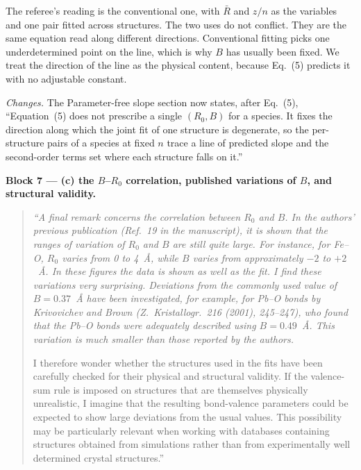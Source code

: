 \documentclass[11pt]{article}
\newenvironment{refquote}%
  {\begin{quote}\itshape\color{black!70}}%
  {\end{quote}}
\begin{document}
The referee's reading is the conventional one, with $\bar R$ and
$z/n$ as the variables and one pair fitted across structures.  The
two uses do not conflict.  They are the same equation read along
different directions.  Conventional fitting picks one underdetermined
point on the line, which is why $B$ has usually been fixed.  We treat
the direction of the line as the physical content, because Eq.~(5)
predicts it with no adjustable constant.

\emph{Changes.}  The Parameter-free slope section now states, after
Eq.~(5), ``Equation~(5) does not prescribe a single $(R_0,B)$ for a
species.  It fixes the direction along which the joint fit of one
structure is degenerate, so the per-structure pairs of a species at
fixed $n$ trace a line of predicted slope and the second-order terms
set where each structure falls on it.''

\textbf{Block 7 --- (c) the $B$--$R_0$ correlation, published
variations of $B$, and structural validity.}

\begin{refquote}
``A final remark concerns the correlation between $R_0$ and $B$.  In
the authors' previous publication (Ref.~19 in the manuscript), it is
shown that the ranges of variation of $R_0$ and $B$ are still quite
large.  For instance, for Fe--O, $R_0$ varies from 0 to 4~\AA, while
$B$ varies from approximately $-2$ to $+2$~\AA.  In these figures the
data is shown as well as the fit.  I find these variations very
surprising.  Deviations from the commonly used value of $B=0.37$~\AA{}
have been investigated, for example, for Pb--O bonds by Krivovichev
and Brown (Z.\ Kristallogr.\ 216 (2001), 245--247), who found that
the Pb--O bonds were adequately described using $B=0.49$~\AA.  This
variation is much smaller than those reported by the authors.

I therefore wonder whether the structures used in the fits have been
carefully checked for their physical and structural validity.  If the
valence-sum rule is imposed on structures that are themselves
physically unrealistic, I imagine that the resulting bond-valence
parameters could be expected to show large deviations from the usual
values.  This possibility may be particularly relevant when working
with databases containing structures obtained from simulations rather
than from experimentally well determined crystal structures.''
\end{refquote}
\end{document}
